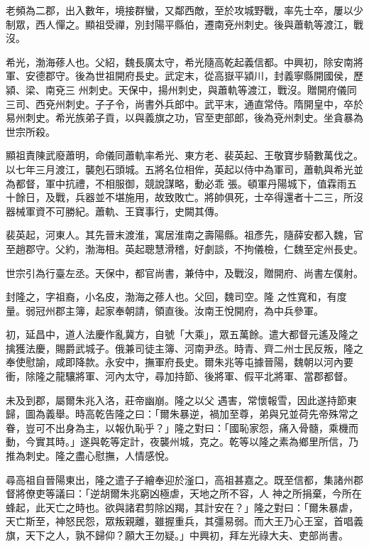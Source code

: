 \begin{pinyinscope}
 老頻為二郡，出入數年，境接群蠻，又鄰西敵，至於攻城野戰，率先士卒，屢以少制眾，西人憚之。顯祖受禪，別封陽平縣伯，遷南兗州刺史。後與蕭軌等渡江，戰沒。



 希光，渤海蓚人也。父紹，魏長廣太守，希光隨高乾起義信都。中興初，除安南將軍、安德郡守。後為世祖開府長史。武定末，從高嶽平潁川，封義寧縣開國侯，歷潁、梁、南兗三
 州刺史。天保中，揚州刺史，與蕭軌等渡江，戰沒。贈開府儀同三司、西兗州刺史。子子令，尚書外兵郎中。武平末，通直常侍。隋開皇中，卒於易州刺史。希光族弟子貢，以與義旗之功，官至吏部郎，後為兗州刺史。坐貪暴為世宗所殺。



 顯祖責陳武廢蕭明，命儀同蕭軌率希光、東方老、裴英起、王敬寶步騎數萬伐之。以七年三月渡江，襲剋石頭城。五將名位相侔，英起以侍中為軍司，蕭軌與希光並為都督，軍中抗禮，不相服御，競說謀略，動必乖
 張。頓軍丹陽城下，值霖雨五十餘日，及戰，兵器並不堪施用，故致敗亡。將帥俱死，士卒得還者十二三，所沒器械軍資不可勝紀。蕭軌、王寶事行，史闕其傳。



 裴英起，河東人。其先晉末渡淮，寓居淮南之壽陽縣。祖彥先，隨薛安都入魏，官至趙郡守。父約，渤海相。英起聰慧滑稽，好劇談，不拘儀檢，仁魏至定州長史。



 世宗引為行臺左丞。天保中，都官尚書，兼侍中，及戰沒，贈開府、尚書左僕射。



 封隆之，字祖裔，小名皮，渤海之蓚人也。父回，魏司空。隆
 之性寬和，有度量。弱冠州郡主簿，起家奉朝請，領直後。汝南王悅開府，為中兵參軍。



 初，延昌中，道人法慶作亂冀方，自號「大乘」，眾五萬餘。遣大都督元遙及隆之擒獲法慶，賜爵武城子。俄兼司徒主簿、河南尹丞。時青、齊二州士民反叛，隆之奉使慰諭，咸即降款。永安中，撫軍府長史。爾朱兆等屯據晉陽，魏朝以河內要衝，除隆之龍驤將軍、河內太守，尋加持節、後將軍、假平北將軍、當郡都督。



 未及到郡，屬爾朱兆入洛，莊帝幽崩。隆之以父
 遇害，常懷報雪，因此遂持節東歸，圖為義舉。時高乾告隆之曰：「爾朱暴逆，禍加至尊，弟與兄並荷先帝殊常之眷，豈可不出身為主，以報仇恥乎？」隆之對曰：「國恥家怨，痛入骨髓，乘機而動，今實其時。」遂與乾等定計，夜襲州城，克之。乾等以隆之素為鄉里所信，乃推為刺史。隆之盡心慰撫，人情感悅。



 尋高祖自晉陽東出，隆之遣子子繪奉迎於滏口，高祖甚嘉之。既至信都，集諸州郡督將僚吏等議曰：「逆胡爾朱兆窮凶極虐，天地之所不容，人
 神之所捐棄，今所在蜂起，此天亡之時也。欲與諸君剪除凶羯，其計安在？」隆之對曰：「爾朱暴虐，天亡斯至，神怒民怨，眾叛親離，雖握重兵，其彊易弱。而大王乃心王室，首唱義旗，天下之人，孰不歸仰？願大王勿疑。」中興初，拜左光祿大夫、吏部尚書。




\end{pinyinscope}
